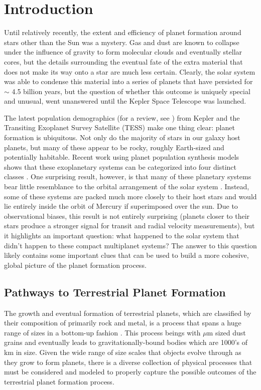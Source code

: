 \chapter {Introduction} \label{ch:intro}

Until relatively recently, the extent and efficiency of planet formation around stars other than the Sun was a mystery. Gas and dust are known to collapse under the influence of gravity to form molecular clouds and eventually stellar cores, but the details surrounding the eventual fate of the extra material that does not make its way onto a star are much less certain. Clearly, the solar system was able to condense this material into a series of planets that have persisted for $\sim$ 4.5 billion years, but the question of whether this outcome is uniquely special and unusual, went unanswered until the Kepler Space Telescope was launched.

The latest population demographics (for a review, see \cite{winn15}) from Kepler and the Transiting Exoplanet Survey Satellite (TESS) make one thing clear: planet formation is ubiquitous. Not only do the majority of stars in our galaxy host planets, but many of these appear to be rocky, roughly Earth-sized and potentially habitable. Recent work using planet population synthesis models shows that these exoplanetary systems can be categorized into four distinct classes \cite{emsenhuber23, mishra23a, mishra23b}. One surprising result, however, is that many of these planetary systems bear little resemblance to the orbital arrangement of the solar system \cite{raymond20}. Instead, some of these systems are packed much more closely to their host stars and would lie entirely inside the orbit of Mercury if superimposed over the sun. Due to observational biases, this result is not entirely surprising (planets closer to their stars produce a stronger signal for transit and radial velocity measurements), but it highlights an important question: what happened to the solar system that didn't happen to these compact multiplanet systems? The answer to this question likely contains some important clues that can be used to build a more cohesive, global picture of the planet formation process.

\section{Pathways to Terrestrial Planet Formation}

The growth and eventual formation of terrestrial planets, which are classified by their composition of primarily rock and metal, is a process that spans a huge range of sizes in a bottom-up fashion \cite{safronov72}. This process beings with $\mu$m sized dust grains and eventually leads to gravitationally-bound bodies which are 1000's of km in size. Given the wide range of size scales that objects evolve through as they grow to form planets, there is a diverse collection of physical processes that must be considered and modeled to properly capture the possible outcomes of the terrestrial planet formation process.

